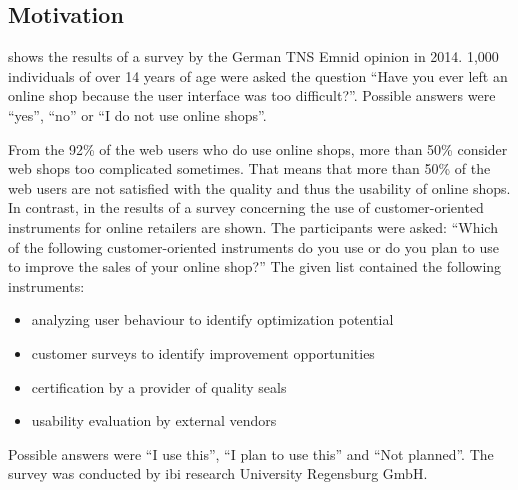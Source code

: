 \documentclass[output=paper]{langsci/langscibook}
\begin{document}
\subsection{Motivation}

 shows the results of a survey by the German TNS Emnid opinion in 2014. 1,000 individuals of over 14 years of age were asked the question ``Have you ever left an online shop because the user interface was too difficult?''. Possible answers were ``yes'', ``no'' or ``I do not use online shops''.


From the 92\% of the web users who do use online shops, more than 50\% consider web shops too complicated sometimes. That means that more than 50\% of the web users are not satisfied with the quality and thus the usability of online shops. In contrast, in  the results of a survey concerning the use of customer-oriented instruments for online retailers are shown. The participants were asked: ``Which of the following customer-oriented instruments do you use or do you plan to use to improve the sales of your online shop?'' The given list contained the following instruments:


\begin{itemize}
\item analyzing user behaviour to identify optimization potential 
\item customer surveys to identify improvement opportunities 
\item certification by a provider of quality seals 
\item usability evaluation by external vendors 
\end{itemize}

Possible answers were ``I use this'', ``I plan to use this'' and ``Not planned''. The survey was conducted by ibi research University Regensburg GmbH. 
\end{document}
